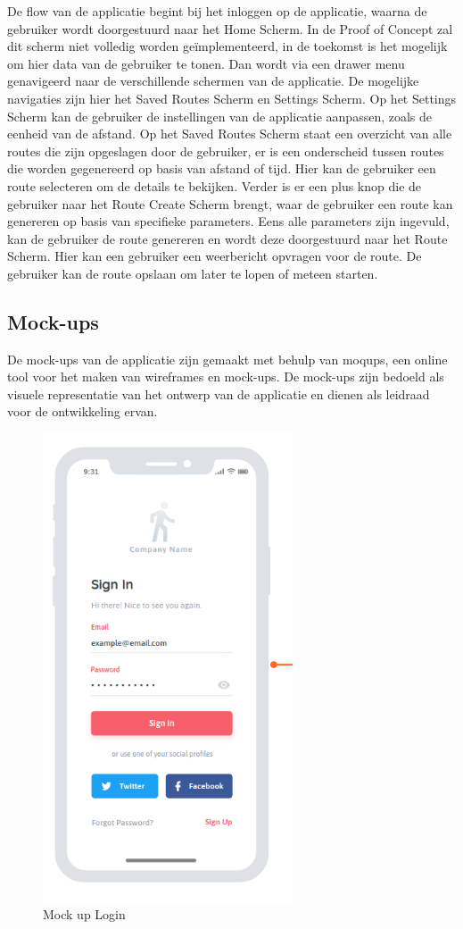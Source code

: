 De flow van de applicatie begint bij het inloggen op de applicatie, waarna de gebruiker wordt doorgestuurd naar het Home Scherm. In de Proof of Concept zal dit scherm niet volledig worden geïmplementeerd, in de toekomst is het mogelijk om hier data van de gebruiker te tonen. Dan wordt via een drawer menu genavigeerd naar de verschillende schermen van de applicatie. De mogelijke navigaties zijn hier het Saved Routes Scherm en Settings Scherm. Op het Settings Scherm kan de gebruiker de instellingen van de applicatie aanpassen, zoals de eenheid van de afstand. Op het Saved Routes Scherm staat een overzicht van alle routes die zijn opgeslagen door de gebruiker, er is een onderscheid tussen routes die worden gegenereerd op basis van afstand of tijd. Hier kan de gebruiker een route selecteren om de details te bekijken. Verder is er een plus knop die de gebruiker naar het Route Create Scherm brengt, waar de gebruiker een route kan genereren op basis van specifieke parameters. Eens alle parameters zijn ingevuld, kan de gebruiker de route genereren en wordt deze doorgestuurd naar het Route Scherm. Hier kan een gebruiker een weerbericht opvragen voor de route. De gebruiker kan de route opslaan om later te lopen of meteen starten.

\subsection{Mock-ups}

De mock-ups van de applicatie zijn gemaakt met behulp van moqups, een online tool voor het maken van wireframes en mock-ups. De mock-ups zijn bedoeld als visuele representatie van het ontwerp van de applicatie en dienen als leidraad voor de ontwikkeling ervan.

    \begin{figure}[htbp]
        \includegraphics[width=20em]{./graphics/login_Mockup.png}
        \centering
        \caption{Mock up Login}
        \label{fig:loginMockup}
    \end{figure}

